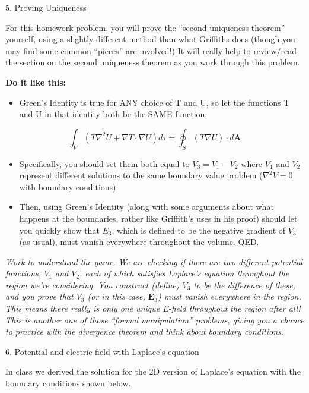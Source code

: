 \documentclass[11pt]{article}
\def\tightlist{}
\begin{document}
{5. Proving Uniqueness}\label{proving-uniqueness}

For this homework problem, you will prove the ``second uniqueness
theorem'' yourself, using a slightly different method than what
Griffiths does (though you may find some common ``pieces'' are
involved!) It will really help to review/read the section on the second
uniqueness theorem as you work through this problem.

\textbf{Do it like this:}

\begin{itemize}
\tightlist
\item
  Green's Identity is true for ANY choice of T and U, so let the
  functions T and U in that identity both be the SAME function.
\end{itemize}

\[\int_V \left(T \nabla^2 U + \nabla T \cdot \nabla U\right) d\tau = \oint_S \left(T \nabla U\right)\cdot d\mathbf{A}\]

\begin{itemize}
\tightlist
\item
  Specifically, you should set them both equal to \(V_3=V_1-V_2\) where
  \(V_1\) and \(V_2\) represent different solutions to the same boundary
  value problem (\(\nabla^2 V = 0\) with boundary conditions).
\item
  Then, using Green's Identity (along with some arguments about what
  happens at the boundaries, rather like Griffith's uses in his proof)
  should let you quickly show that \(E_3\), which is defined to be the
  negative gradient of \(V_3\) (as usual), must vanish everywhere
  throughout the volume. QED.
\end{itemize}

\emph{Work to understand the game. We are checking if there are two
different potential functions, \(V_1\) and \(V_2\), each of which
satisfies Laplace's equation throughout the region we're considering.
You construct (define) \(V_3\) to be the difference of these, and you
prove that \(V_3\) (or in this case, \(\mathbf{E}_3\)) must vanish
everywhere in the region. This means there really is only one unique
E-field throughout the region after all! This is another one of those
``formal manipulation'' problems, giving you a chance to practice with
the divergence theorem and think about boundary conditions.}

{6. Potential and electric field with Laplace's
equation}\label{potential-and-electric-field-with-laplaces-equation}

In class we derived the solution for the 2D version of Laplace's
equation with the boundary conditions shown below.
\end{document}
